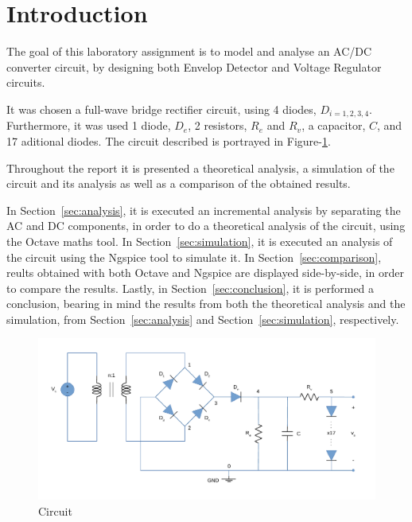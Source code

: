 \section{Introduction}
\label{sec:introduction}

The goal of this laboratory assignment is to model and analyse an AC/DC converter
circuit, by designing both Envelop Detector and Voltage Regulator circuits.\par

It was chosen a full-wave bridge rectifier circuit, using 4 diodes, $D_{i={1,2,3,4}}$.
Furthermore, it was used 1 diode, $D_e$, 2 resistors, $R_e$ and $R_v$, a capacitor,
$C$, and 17 aditional diodes. The circuit described is portrayed in Figure-\ref{fig:circuit}.\par

Throughout the report it is presented a theoretical analysis, a simulation of the
circuit and its analysis as well as a comparison of the obtained results. \par

In Section~\ref{sec:analysis}, it is executed an incremental analysis by separating
the AC and DC components, in order to do a theoretical analysis of the circuit,
using the Octave maths tool.
In Section~\ref{sec:simulation}, it is executed an analysis of the circuit using
the Ngspice tool to simulate it.
In Section~\ref{sec:comparison}, reults obtained with both Octave and Ngspice are
displayed side-by-side, in order to compare the results.
Lastly, in Section~\ref{sec:conclusion}, it is performed a conclusion, bearing in mind the
results from both the theoretical analysis and the simulation, from Section~\ref{sec:analysis}
and Section~\ref{sec:simulation}, respectively.\par


\begin{figure}[h] \centering
\includegraphics[width=1\linewidth]{circuit.pdf}
\caption{Circuit}
\label{fig:circuit}
\end{figure}

\newpage
